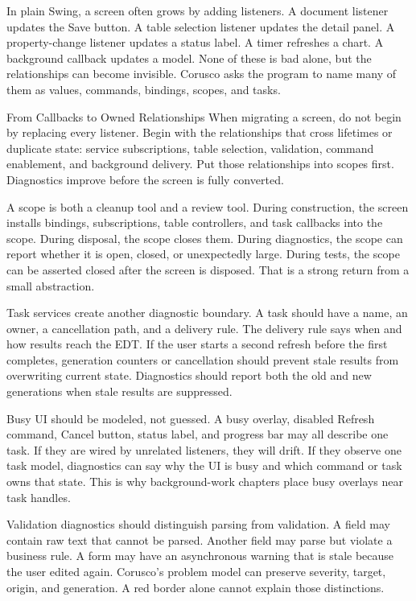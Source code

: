 In plain Swing, a screen often grows by adding listeners. A document listener updates the Save button. A table selection listener updates the detail panel. A property-change listener updates a status label. A timer refreshes a chart. A background callback updates a model. None of these is bad alone, but the relationships can become invisible. Corusco asks the program to name many of them as values, commands, bindings, scopes, and tasks.

\begin{migrationbox}{From Callbacks to Owned Relationships}
When migrating a screen, do not begin by replacing every listener. Begin with the relationships that cross lifetimes or duplicate state: service subscriptions, table selection, validation, command enablement, and background delivery. Put those relationships into scopes first. Diagnostics improve before the screen is fully converted.
\end{migrationbox}

A scope is both a cleanup tool and a review tool. During construction, the screen installs bindings, subscriptions, table controllers, and task callbacks into the scope. During disposal, the scope closes them. During diagnostics, the scope can report whether it is open, closed, or unexpectedly large. During tests, the scope can be asserted closed after the screen is disposed. That is a strong return from a small abstraction.

Task services create another diagnostic boundary. A task should have a name, an owner, a cancellation path, and a delivery rule. The delivery rule says when and how results reach the EDT. If the user starts a second refresh before the first completes, generation counters or cancellation should prevent stale results from overwriting current state. Diagnostics should report both the old and new generations when stale results are suppressed.

Busy UI should be modeled, not guessed. A busy overlay, disabled Refresh command, Cancel button, status label, and progress bar may all describe one task. If they are wired by unrelated listeners, they will drift. If they observe one task model, diagnostics can say why the UI is busy and which command or task owns that state. This is why background-work chapters place busy overlays near task handles.

Validation diagnostics should distinguish parsing from validation. A field may contain raw text that cannot be parsed. Another field may parse but violate a business rule. A form may have an asynchronous warning that is stale because the user edited again. Corusco's problem model can preserve severity, target, origin, and generation. A red border alone cannot explain those distinctions.

